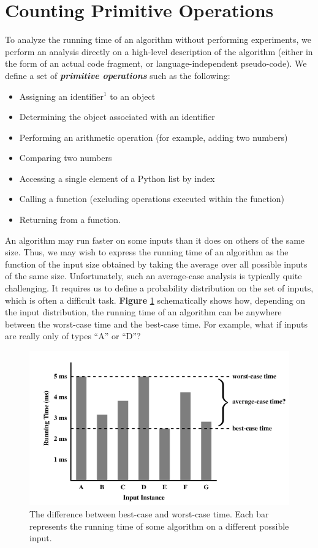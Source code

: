 \documentclass[a4paper,12pt]{report}
\begin{document}
\section{Counting Primitive Operations}
To analyze the running time of an algorithm without performing experiments, we
perform an analysis directly on a high-level description of the algorithm (either in
the form of an actual code fragment, or language-independent pseudo-code). We
define a set of \textit{\textbf{primitive operations}} such as the following:
\begin{itemize}
	\item Assigning an identifier$^1$ to an object
	\item Determining the object associated with an identifier
	\item Performing an arithmetic operation (for example, adding two numbers)
	\item Comparing two numbers
	\item Accessing a single element of a Python list by index
	\item Calling a function (excluding operations executed within the function)
	\item Returning from a function.
\end{itemize}
An algorithm may run faster on some inputs than it does on others of the same size.
Thus, we may wish to express the running time of an algorithm as the function of
the input size obtained by taking the average over all possible inputs of the same
size. Unfortunately, such an average-case analysis is typically quite challenging.
It requires us to define a probability distribution on the set of inputs, which is often
a difficult task. \textbf{Figure} \ref{fig2} schematically shows how, depending on the input distribution, the running time of an algorithm can be anywhere between the worst-case
time and the best-case time. For example, what if inputs are really only of types
“A” or “D”?
\begin{figure}[h]
	\label{fig2}
	\centering
	\includegraphics[scale=0.65]{"fig2.png"}
	\caption{\label{fig2}\textsf{ The difference between best-case and worst-case time.
	Each bar represents the running time of some algorithm on a different
	possible input.}}
\end{figure}
\end{document}
